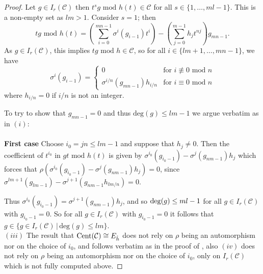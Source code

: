 \documentclass[12pt]{amsart}
\theoremstyle{plain}
\theoremstyle{definition}
\numberwithin{equation}{section}
\numberwithin{figure}{section}
\begin{document}
\begin{proof}
 Let $g\in I_r(\mathcal{C})$ then $t^s g \text{ mod } h(t)
 \in \mathcal{C}$ for all $s\in \{1,\dots , {ml-1}\}$. This is a non-empty set as $lm>1.$  Consider $s=1$; then
 $$tg \text{ mod } h(t)=\left(\sum_{i=0}^{mn-1}\sigma^i(g_{i-1})t^i\right)-\left(\sum_{j=0}^{m-1}h_jt^{nj}\right) g_{mn-1}.$$
As $g\in I_r(\mathcal{C})$, this implies $t g\text{ mod } h\in \mathcal{C}$, so for all $i\in\lbrace lm+1,\dots, mn-1\rbrace$, we have
\begin{equation}\label{eqn:nucleus g_i}
\sigma^i(g_{i-1})=\begin{cases}
0& \text{for } i\not\equiv 0\text{ mod }n\\
 \sigma^{i/n}(g_{mn-1}) h_{i/n} & \text{for } i\equiv 0\text{ mod }n
\end{cases}
\end{equation}
where $h_{i/n}=0$ if $i/n$ is not an integer.

To try to show that $g_{mn-1}=0$ and thus $\text{deg}(g)\leq lm-1$ we argue verbatim as in $(i)$:
\\
\\ {\bf First case}
Choose $i_0=jn\leq lm-1$ and suppose that $h_j\not=0$. Then the coefficient of $t^{i_0}$ in $gt \text{ mod } h(t)$
is given by
$\sigma^{i_0}(g_{i_0-1})-\sigma^j(g_{nm-1})h_j$ which forces that $\rho(\sigma^{i_0}(g_{i_0-1})-\sigma^j(g_{nm-1})h_j)=0$, since $\sigma^{lm+1}(g_{lm-1})-\sigma^{j+1}(g_{nm-1}h_{lm/n})=0 $.

 Thus $\sigma^{i_0}(g_{i_0-1})=\sigma^{j+1}(g_{nm-1})h_j$,
and so ${\rm deg}(g)\leq ml-1$ for all $g\in  I_r(\mathcal{C})$ with $g_{i_0-1}=0$. So for all
$g \in  I_r(\mathcal{C})$ with $g_{i_0-1}=0$ it follows that $g\in \{ g\in I_r(\mathcal{C}) \,|\, \text{deg}(g)\leq lm\rbrace$.
\\ $(iii)$
The result that ${\rm Cent}(\mathcal{C})\cong E_{\hat{h}}$ does not rely on $\rho$ being an automorphism nor on the choice of $i_0$,
and  follows verbatim  as in the proof of \cite[Theorem 9]{Sheekey}, also $(iv)$ does not rely on $\rho$ being an automorphism nor on the choice of $i_0$, only on $I_r(\mathcal{C})$ which is not fully computed above.
\end{proof}
\end{document}
